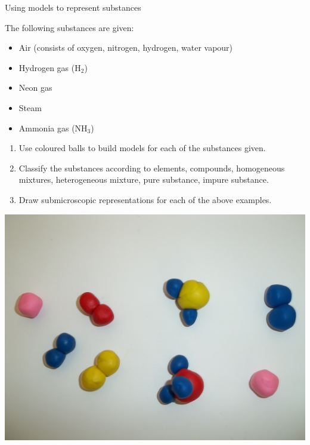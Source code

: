   \label{m38708*eip-326}
\begin{activity}{Using models to represent substances}{
\begin{minipage}{.5\textwidth}
The following substances are given:
\label{m38708*eip-id1166921187210}
\begin{itemize}[noitemsep]
    \item Air (consists of oxygen, nitrogen, hydrogen, water vapour)
    \item Hydrogen gas ($\text{H}_2$)
    \item Neon gas
    \item Steam
    \item Ammonia gas ($\text{NH}_3$)
\end{itemize}
\noindent
\begin{enumerate}[noitemsep, label=\textbf{\arabic*}.]
\item Use coloured balls to build models for each of the substances given.
\item Classify the substances according to elements, compounds, homogeneous mixtures, heterogeneous mixture, pure substance, impure substance.
\item Draw submicroscopic representations for each of the above examples.
\end{enumerate}
\end{minipage}
\begin{minipage}{.5\textwidth}
\begin{center}
 \includegraphics[width=.8\textwidth]{photos/models_classification.jpg}\par
\end{center}
\end{minipage}
}
\end{activity}
\par \label{m38708*secfhsst!!!underscore!!!id212}
